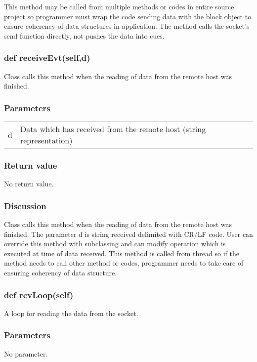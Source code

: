 \documentclass[a4paper,10pt]{jsarticle}
\begin{document}
This method may be called from multiple methods or codes in entire source project so programmer must wrap the code sending data with the block object to ensure coherency of data structures in application.
The method calls the socket's send function directly, not pushes the data into cues.


\subsubsection{def receiveEvt(self,d)}
Class calls this method when the reading of data from the remote host was finished.

\subsubsection*{Parameters}
\begin{tabular}{ll}
d	&Data which has received from the remote host (string representation)
\end{tabular}

\subsubsection*{Return value}
No return value.

\subsubsection*{Discussion}
Class calls  this method when the reading of data from the remote host was finished.
The parameter d is string received delimited with CR/LF code.
User can override this method with subclassing and can modify operation which is executed at time of data received.
This method is called from thread so if the method needs to call other method or codes, programmer needs to take care of ensuring coherency of data structure.


\subsubsection{def rcvLoop(self)}
A loop for reading the data from the socket.

\subsubsection*{Parameters}
No parameter.
\end{document}
